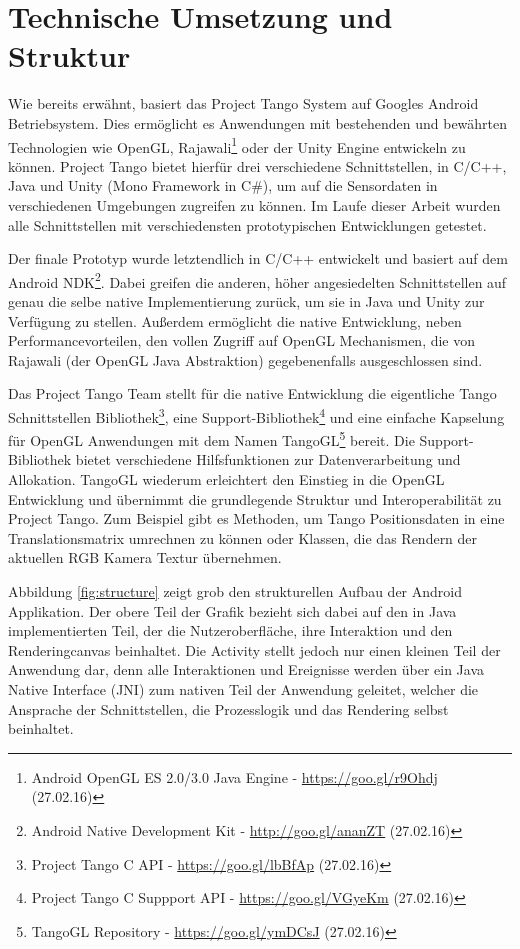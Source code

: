 \section{Technische Umsetzung und Struktur} \label{eq:technic}

Wie bereits erwähnt, basiert das Project Tango System auf Googles Android Betriebsystem. Dies ermöglicht es Anwendungen mit bestehenden und bewährten Technologien wie OpenGL, Rajawali\footnote{Android OpenGL ES 2.0/3.0 Java Engine - \url{https://goo.gl/r9Ohdj} (27.02.16)} oder der Unity Engine entwickeln zu können. Project Tango bietet hierfür drei verschiedene Schnittstellen, in C/C++, Java und Unity (Mono Framework in C\#), um auf die Sensordaten in verschiedenen Umgebungen zugreifen zu können. Im Laufe dieser Arbeit wurden alle Schnittstellen mit verschiedensten prototypischen Entwicklungen getestet.

Der finale Prototyp wurde letztendlich in C/C++ entwickelt und basiert auf dem Android NDK\footnote{Android Native Development Kit - \url{http://goo.gl/ananZT} (27.02.16)}. Dabei greifen die anderen, höher angesiedelten Schnittstellen auf genau die selbe native Implementierung zurück, um sie in Java und Unity zur Verfügung zu stellen. Außerdem ermöglicht die native Entwicklung, neben Performancevorteilen, den vollen Zugriff auf OpenGL Mechanismen, die von Rajawali (der OpenGL Java Abstraktion) gegebenenfalls ausgeschlossen sind. 

Das Project Tango Team stellt für die native Entwicklung die eigentliche Tango Schnittstellen Bibliothek\footnote{Project Tango C API - \url{https://goo.gl/lbBfAp} (27.02.16)}, eine Support-Bibliothek\footnote{Project Tango C Suppport API - \url{https://goo.gl/VGyeKm} (27.02.16)} und eine einfache Kapselung für OpenGL Anwendungen mit dem Namen TangoGL\footnote{TangoGL Repository - \url{https://goo.gl/ymDCsJ} (27.02.16)} bereit. Die Support-Bibliothek bietet verschiedene Hilfsfunktionen zur Datenverarbeitung und Allokation. TangoGL wiederum erleichtert den Einstieg in die OpenGL Entwicklung und übernimmt die grundlegende Struktur und Interoperabilität zu Project Tango. Zum Beispiel gibt es Methoden, um Tango Positionsdaten in eine Translationsmatrix umrechnen zu können oder Klassen, die das Rendern der aktuellen RGB Kamera Textur übernehmen. 

Abbildung \ref{fig:structure} zeigt grob den strukturellen Aufbau der Android Applikation. Der obere Teil der Grafik bezieht sich dabei auf den in Java implementierten Teil, der die Nutzeroberfläche, ihre Interaktion und den Renderingcanvas beinhaltet. Die Activity stellt jedoch nur einen kleinen Teil der Anwendung dar, denn alle Interaktionen und Ereignisse werden über ein Java Native Interface (JNI) zum nativen Teil der Anwendung geleitet, welcher die Ansprache der Schnittstellen, die Prozesslogik und das Rendering selbst beinhaltet. 

